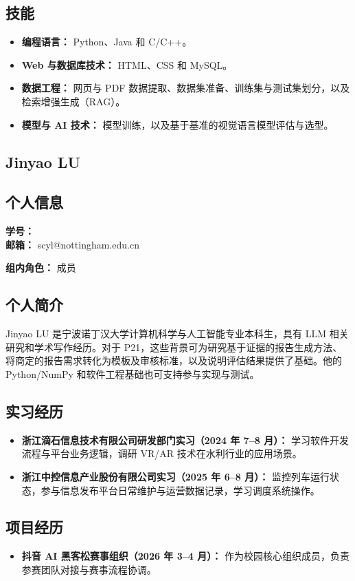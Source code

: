 \documentclass[a4paper,12pt]{article}
\newcommand{\PersonalInformation}[2]{%
  \subsection*{个人信息}
  \if\relax\detokenize{#1}\relax\else
  \noindent\textbf{学号：} #1\\
  \fi
  \textbf{邮箱：} #2\par
}
\begin{document}
\subsection*{技能}
\begin{itemize}
  \item \textbf{编程语言：} Python、Java 和 C/C++。
  \item \textbf{Web 与数据库技术：} HTML、CSS 和 MySQL。
  \item \textbf{数据工程：} 网页与 PDF 数据提取、数据集准备、训练集与测试集划分，以及检索增强生成（RAG）。
  \item \textbf{模型与 AI 技术：} 模型训练，以及基于基准的视觉语言模型评估与选型。
\end{itemize}

\subsection{Jinyao LU}
\PersonalInformation{}{scyl@nottingham.edu.cn}
\noindent\textbf{组内角色：} 成员\par

\subsection*{个人简介}
Jinyao LU 是宁波诺丁汉大学计算机科学与人工智能专业本科生，具有 LLM 相关研究和学术写作经历。对于 P21，这些背景可为研究基于证据的报告生成方法、将商定的报告需求转化为模板及审核标准，以及说明评估结果提供了基础。他的 Python/NumPy 和软件工程基础也可支持参与实现与测试。

\subsection*{实习经历}
\begin{itemize}
  \item \textbf{浙江滴石信息技术有限公司研发部门实习（2024 年 7--8 月）：} 学习软件开发流程与平台业务逻辑，调研 VR/AR 技术在水利行业的应用场景。
  \item \textbf{浙江中控信息产业股份有限公司实习（2025 年 6--8 月）：} 监控列车运行状态，参与信息发布平台日常维护与运营数据记录，学习调度系统操作。
\end{itemize}

\subsection*{项目经历}
\begin{itemize}
  \item \textbf{抖音 AI 黑客松赛事组织（2026 年 3--4 月）：} 作为校园核心组织成员，负责参赛团队对接与赛事流程协调。
\end{itemize}
\end{document}

